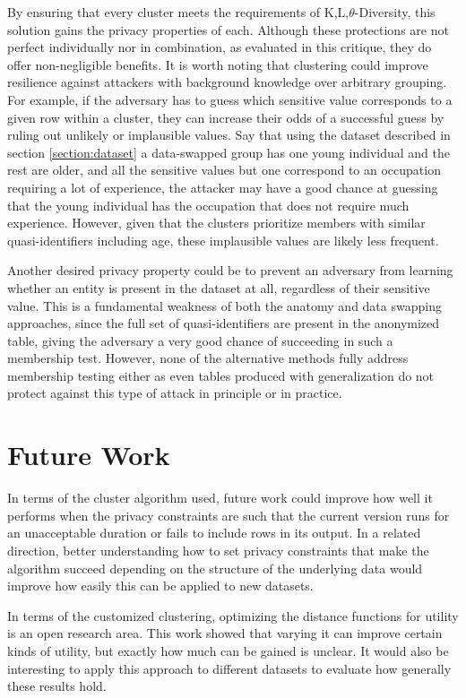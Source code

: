 By ensuring that every cluster meets the requirements of K,L,$\theta$-Diversity, this solution gains the privacy properties of each. Although these protections are not perfect individually nor in combination, as evaluated in this critique\cite{domingoCritique}, they do offer non-negligible benefits. It is worth noting that clustering could improve resilience against attackers with background knowledge over arbitrary grouping. For example, if the adversary has to guess which sensitive value corresponds to a given row within a cluster, they can increase their odds of a successful guess by ruling out unlikely or implausible values. Say that using the dataset described in section \ref{section:dataset} a data-swapped group has one young individual and the rest are older, and all the sensitive values but one correspond to an occupation requiring a lot of experience, the attacker may have a good chance at guessing that the young individual has the occupation that does not require much experience. However, given that the clusters prioritize members with similar quasi-identifiers including age, these implausible values are likely less frequent.

Another desired privacy property could be to prevent an adversary from learning whether an entity is present in the dataset at all, regardless of their sensitive value. This is a fundamental weakness of both the anatomy and data swapping approaches, since the full set of quasi-identifiers are present in the anonymized table, giving the adversary a very good chance of succeeding in such a membership test. However, none of the alternative methods fully address membership testing either as even tables produced with generalization do not protect against this type of attack in principle or in practice.

\section{Future Work}
In terms of the cluster algorithm used, future work could improve how well it performs when the privacy constraints are such that the current version runs for an unacceptable duration or fails to include rows in its output. In a related direction, better understanding how to set privacy constraints that make the algorithm succeed depending on the structure of the underlying data would improve how easily this can be applied to new datasets.

In terms of the customized clustering, optimizing the distance functions for utility is an open research area. This work showed that varying it can improve certain kinds of utility, but exactly how much can be gained is unclear. It would also be interesting to apply this approach to different datasets to evaluate how generally these results hold.

